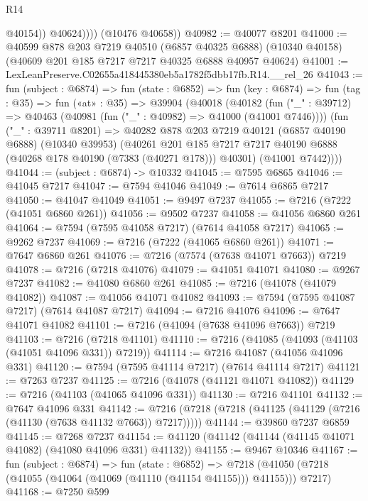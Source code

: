 \begin{lexlean}{R14}
\begin{coremodule}
                  @40154))
              @40624))))
      (@10476 @40658))
@40982 := @40077 @8201
@41000 := @40599
    @878
    @203
    @7219
    @40510
    (@6857 @40325 @6888)
    (@10340 @40158)
    (@40609 @201 @185 @7217 @7217 @40325 @6888 @40957 @40624)
@41001 := LexLeanPreserve.C02655a418445380eb5a1782f5dbb17fb.R14.__rel_26
@41043 := fun (subject : @6874) =>
  fun (state : @6852) =>
  fun (key : @6874) =>
  fun (tag : @35) =>
  fun («at» : @35) =>
  @39904
    (@40018
      (@40182
        (fun ("_" : @39712) => @40463 (@40981 (fun ("_" : @40982) => @41000 (@41001 @7446))))
        (fun ("_" : @39711 @8201) =>
        @40282
          @878
          @203
          @7219
          @40121
          (@6857 @40190 @6888)
          (@10340 @39953)
          (@40261
            @201
            @185
            @7217
            @7217
            @40190
            @6888
            (@40268 @178 @40190 (@7383 (@40271 @178)))
            @40301)
          (@41001 @7442))))
@41044 := (subject : @6874) -> @10332
@41045 := @7595 @6865
@41046 := @41045 @7217
@41047 := @7594 @41046
@41049 := @7614 @6865 @7217
@41050 := @41047 @41049
@41051 := @9497 @7237
@41055 := @7216 (@7222 (@41051 @6860 @261))
@41056 := @9502 @7237
@41058 := @41056 @6860 @261
@41064 := @7594 (@7595 @41058 @7217) (@7614 @41058 @7217)
@41065 := @9262 @7237
@41069 := @7216 (@7222 (@41065 @6860 @261))
@41071 := @7647 @6860 @261
@41076 := @7216 (@7574 (@7638 @41071 @7663)) @7219
@41078 := @7216 (@7218 @41076)
@41079 := @41051 @41071
@41080 := @9267 @7237
@41082 := @41080 @6860 @261
@41085 := @7216 (@41078 (@41079 @41082))
@41087 := @41056 @41071 @41082
@41093 := @7594 (@7595 @41087 @7217) (@7614 @41087 @7217)
@41094 := @7216 @41076
@41096 := @7647 @41071 @41082
@41101 := @7216 (@41094 (@7638 @41096 @7663)) @7219
@41103 := @7216 (@7218 @41101)
@41110 := @7216 (@41085 (@41093 (@41103 (@41051 @41096 @331)) @7219))
@41114 := @7216 @41087 (@41056 @41096 @331)
@41120 := @7594 (@7595 @41114 @7217) (@7614 @41114 @7217)
@41121 := @7263 @7237
@41125 := @7216 (@41078 (@41121 @41071 @41082))
@41129 := @7216 (@41103 (@41065 @41096 @331))
@41130 := @7216 @41101
@41132 := @7647 @41096 @331
@41142 := @7216 (@7218 (@7218 (@41125 (@41129 (@7216 (@41130 (@7638 @41132 @7663)) @7217)))))
@41144 := @39860 @7237 @6859
@41145 := @7268 @7237
@41154 := @41120 (@41142 (@41144 (@41145 @41071 @41082) (@41080 @41096 @331) @41132))
@41155 := @9467 @10346
@41167 := fun (subject : @6874) =>
  fun (state : @6852) =>
  @7218 (@41050 (@7218 (@41055 (@41064 (@41069 (@41110 (@41154 @41155))) @41155))) @7217)
@41168 := @7250 @599

\end{coremodule}
\end{lexlean}
